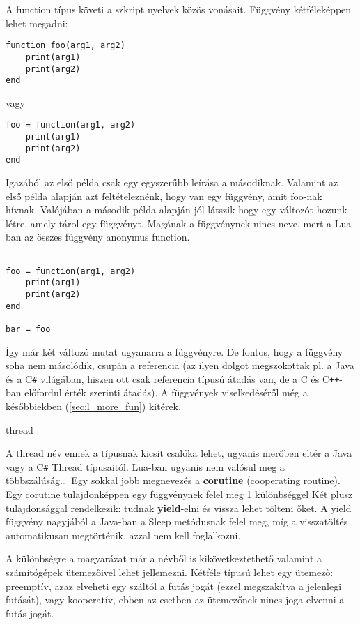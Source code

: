 A function típus követi a szkript nyelvek közös vonásait. Függvény kétféleképpen lehet megadni:
\scriptsize
\begin{lstlisting}
function foo(arg1, arg2)
	print(arg1)
	print(arg2)
end
\end{lstlisting}
\normalsize
vagy 
\scriptsize
\begin{lstlisting}
foo = function(arg1, arg2)
	print(arg1)
	print(arg2)
end
\end{lstlisting}
\normalsize
Igazából az első példa csak egy egyszerűbb leírása a másodiknak. Valamint az első példa alapján azt feltételeznénk, hogy van egy függvény, amit foo-nak hívnak. Valójában a második példa alapján jól látszik hogy egy változót hozunk létre, amely tárol egy függvényt. Magának a függvénynek nincs neve, mert a Lua-ban az összes függvény anonymus function. 
\scriptsize
\begin{lstlisting}

foo = function(arg1, arg2)
	print(arg1)
	print(arg2)
end

bar = foo
\end{lstlisting}
\normalsize
Így már két változó mutat ugyanarra a függvényre. De fontos, hogy a függvény soha nem másolódik, csupán a referencia (az ilyen dolgot megszokottak pl. a Java és a C\verb|#| világában, hiszen ott csak referencia típusú átadás van, de a C és C\verb|++|-ban előfordul érték szerinti átadás). A függvények viselkedéséről még a későbbiekben (\ref{sec:l_more_fun}) kitérek.

\bigskip

\Large thread \normalsize

\bigskip

A thread név ennek a típusnak kicsit csalóka lehet, ugyanis merőben eltér a Java vagy a C\verb|#| Thread típusaitól. Lua-ban ugyanis nem valósul meg a többszálúság\dots~Egy sokkal jobb megnevezés a \textbf{corutine} (cooperating routine). Egy corutine tulajdonképpen egy függvénynek felel meg 1 különbséggel Két plusz tulajdonsággal rendelkezik: tudnak \textbf{yield}-elni és vissza lehet tölteni őket. A yield függvény nagyjából a Java-ban a Sleep metódusnak felel meg, míg a visszatöltés automatikusan megtörténik, azzal nem kell foglalkozni. 

A különbségre a magyarázat már a névből is kikövetkeztethető valamint a számítógépek ütemezőivel lehet jellemezni. Kétféle típusú lehet egy ütemező: preemptív, azaz elveheti egy száltól a futás jogát (ezzel megszakítva a jelenlegi futását), vagy kooperatív, ebben az esetben az ütemezőnek nincs joga elvenni a futás jogát. 


